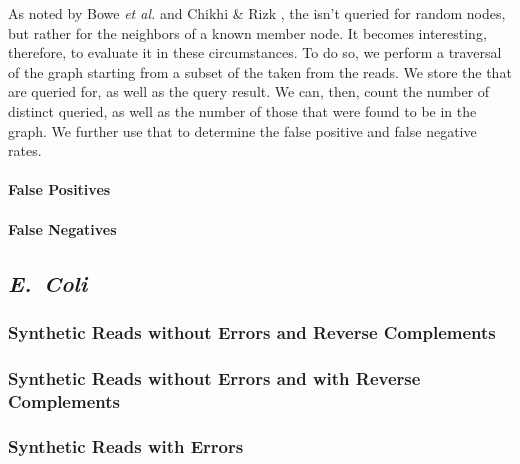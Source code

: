 As noted by Bowe \emph{et al.} \cite{Bowe2012} and Chikhi \& Rizk \cite{Chikhi2013}, the \dBG isn't queried for random nodes, but rather for the neighbors of a known member node.  It becomes interesting, therefore, to evaluate it in these circumstances. To do so, we perform a traversal of the graph starting from a subset of the  taken from the reads. We store the  that are queried for, as well as the query result. We can, then, count the number of distinct  queried, as well as the number of those that were found to be in the graph. We further use that to determine the false positive and false negative rates. 

\paragraph{False Positives}

\paragraph{False Negatives}

\subsection{\emph{E.~Coli}}

\subsubsection{Synthetic Reads without Errors and Reverse Complements}

\subsubsection{Synthetic Reads without Errors and with Reverse Complements}

\subsubsection{Synthetic Reads with Errors}

